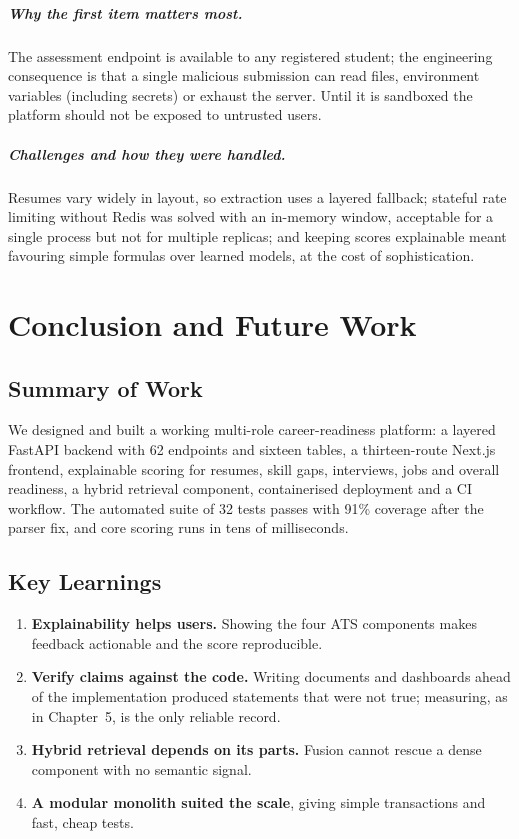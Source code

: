 \documentclass[openany]{tietreport}
\begin{document}
\paragraph{Why the first item matters most.} The assessment endpoint is available to any registered student; the engineering consequence is that a single malicious submission can read files, environment variables (including secrets) or exhaust the server. Until it is sandboxed the platform should not be exposed to untrusted users.

\paragraph{Challenges and how they were handled.} Resumes vary widely in layout, so extraction uses a layered fallback; stateful rate limiting without Redis was solved with an in-memory window, acceptable for a single process but not for multiple replicas; and keeping scores explainable meant favouring simple formulas over learned models, at the cost of sophistication.

\chapter{Conclusion and Future Work}

\section{Summary of Work}
We designed and built a working multi-role career-readiness platform: a layered FastAPI backend with 62 endpoints and sixteen tables, a thirteen-route Next.js frontend, explainable scoring for resumes, skill gaps, interviews, jobs and overall readiness, a hybrid retrieval component, containerised deployment and a CI workflow. The automated suite of 32 tests passes with 91\% coverage after the parser fix, and core scoring runs in tens of milliseconds.

\section{Key Learnings}
\begin{enumerate}
  \item \textbf{Explainability helps users.} Showing the four ATS components makes feedback actionable and the score reproducible.
  \item \textbf{Verify claims against the code.} Writing documents and dashboards ahead of the implementation produced statements that were not true; measuring, as in Chapter~5, is the only reliable record.
  \item \textbf{Hybrid retrieval depends on its parts.} Fusion cannot rescue a dense component with no semantic signal.
  \item \textbf{A modular monolith suited the scale}, giving simple transactions and fast, cheap tests.
\end{enumerate}
\end{document}
